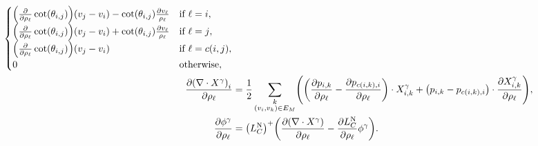 \begin{align*}
\begin{cases}
		\pof{\frac{\partial}{\partial \rho_\ell}\cot\pof{\theta_{i, j}}}\pof{v_j - v_i} - \cot\pof{\theta_{i, j}}\frac{\partial v_\ell}{\rho_\ell} & \text{if \(\ell = i\)}, \\
		\pof{\frac{\partial}{\partial \rho_\ell}\cot\pof{\theta_{i, j}}}\pof{v_j - v_i} + \cot\pof{\theta_{i, j}}\frac{\partial v_\ell}{\rho_\ell} & \text{if \(\ell = j\)}, \\
		\pof{\frac{\partial}{\partial \rho_\ell}\cot\pof{\theta_{i, j}}}\pof{v_j - v_i} & \text{if \(\ell = c\pof{i, j}\)}, \\
		0 & \text{otherwise},
	\end{cases} \\
	\frac{\partial \pof{\nabla \cdot X^\gamma}_i}{\partial \rho_\ell} &= \frac{1}{2}\sum_{\substack{k \\ \pof{v_i, v_k} \in E_M}}\pof{\pof{\frac{\partial p_{i, k}}{\partial \rho_\ell} - \frac{\partial p_{c\pof{i, k}, i}}{\partial \rho_\ell}} \cdot X^\gamma_{i, k} + \pof{p_{i, k} - p_{c\pof{i, k}, i}} \cdot \frac{\partial X^\gamma_{i, k}}{\partial \rho_\ell}}, \\
	\frac{\partial \phi^\gamma}{\partial \rho_\ell} &= \pof{L_C^{\text{N}}}^+\pof{\frac{\partial \pof{\nabla \cdot X^\gamma}}{\partial \rho_\ell} - \frac{\partial L_C^{\text{N}}}{\partial \rho_\ell}\phi^\gamma}.
\end{align*}
